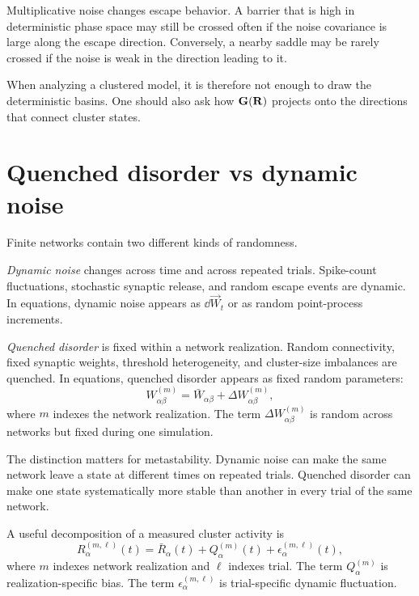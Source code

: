 Multiplicative noise changes escape behavior. A barrier that is high in deterministic phase space may still be crossed often if the noise covariance is large along the escape direction. Conversely, a nearby saddle may be rarely crossed if the noise is weak in the direction leading to it.

When analyzing a clustered model, it is therefore not enough to draw the deterministic basins. One should also ask how $\mathbf{G}(\mathbf{R})$ projects onto the directions that connect cluster states.

\section{Quenched disorder vs dynamic noise}
\label{sec:quenched-disorder-vs-dynamic-noise}

Finite networks contain two different kinds of randomness.

\emph{Dynamic noise} changes across time and across repeated trials. Spike-count fluctuations, stochastic synaptic release, and random escape events are dynamic. In equations, dynamic noise appears as $\dd \vec W_t$ or as random point-process increments.

\emph{Quenched disorder} is fixed within a network realization. Random connectivity, fixed synaptic weights, threshold heterogeneity, and cluster-size imbalances are quenched. In equations, quenched disorder appears as fixed random parameters:
%
\begin{equation}
  W_{\alpha\beta}^{(m)}
  =
  \bar W_{\alpha\beta}
  +
  \Delta W_{\alpha\beta}^{(m)},
  \label{eq:quenched-disorder-network-m}
\end{equation}
%
where $m$ indexes the network realization. The term $\Delta W_{\alpha\beta}^{(m)}$ is random across networks but fixed during one simulation.

The distinction matters for metastability. Dynamic noise can make the same network leave a state at different times on repeated trials. Quenched disorder can make one state systematically more stable than another in every trial of the same network.

A useful decomposition of a measured cluster activity is
%
\begin{equation}
  R_\alpha^{(m,\ell)}(t)
  =
  \bar R_\alpha(t)
  +
  Q_\alpha^{(m)}(t)
  +
  \epsilon_\alpha^{(m,\ell)}(t),
  \label{eq:quenched-dynamic-decomposition}
\end{equation}
%
where $m$ indexes network realization and $\ell$ indexes trial. The term $Q_\alpha^{(m)}$ is realization-specific bias. The term $\epsilon_\alpha^{(m,\ell)}$ is trial-specific dynamic fluctuation.

